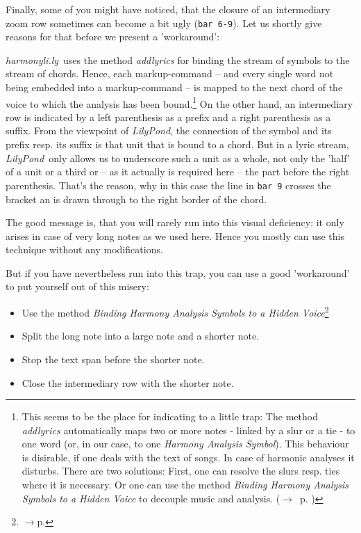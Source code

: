 \documentclass[
  DIV=calc,
  BCOR=5mm,
  12pt,
  headings=small,
  oneside,
  abstract=true,
  toc=bib,
  xcolor=dvipsnames,
  openany,
  english]{scrartcl}
\newcommand{\acc}[0]{\textit}
\newcommand{\ra}[0]{$\rightarrow$}
\newcommand{\hlyn}[0]{\textit{harmonyli.ly}}
\newcommand{\lily}[0]{\textit{LilyPond}}
\newcommand{\has}[1]{\textit{Harmony Analysis Symbol#1}}
\begin{document}
Finally, some of you might have noticed, that the closure of an intermediary
zoom row sometimes can become a bit ugly (\texttt{bar 6-9}). Let us shortly
give reasons for that before we present a 'workaround':

\hlyn\ uses the method \acc{addlyrics} for binding the stream of symbols to the
stream of chords. Hence, each markup-command -- and every single word not being
embedded into a markup-command -- is mapped to the next chord of the voice to
which the analysis has been bound.\footnote{This seems to be the place for
indicating to a little trap: The method \acc{addlyrics} automatically maps two
or more notes - linked by a slur or a tie - to one word (or, in our case, to one
\has{}). This behaviour is disirable, if one deals with the text of songs. In
case of harmonic analyses it disturbs. There are two solutions: First, one can
resolve the slurs resp. ties where it is necessary. Or one can use the method
\acc{Binding \has{s} to a Hidden Voice} to decouple music and analysis. (\ra \
p. \pageref{HiddenVoice})} On the other hand, an intermediary row is indicated
by a left parenthesis as a prefix and a right parenthesis as a suffix.
From the viewpoint of \lily, the connection of the symbol and its prefix resp.
its suffix is that unit that is bound to a chord. But in a lyric stream, \lily\
only allows us to underscore such a unit as a whole, not only the 'half' of a
unit or a third or -- as it actually is required here -- the part before the
right parenthesis. That's the reason, why in this case the line in \texttt{bar
9} crosses the bracket an is drawn through to the right border of the chord.

The good message is, that you will rarely run into this visual deficiency:
it only arises in case of very long notes as we used here. Hence you mostly can
use this technique without any modifications.

But if you have nevertheless run into this trap, you can use a good
'workaround' to put yourself out of this misery:

\begin{itemize}
  \item Use the method \acc{Binding \has{s} to a Hidden Voice}\footnote{\ra p.
  \pageref{HiddenVoice}}
  \item Split the long note into a large note and a shorter note.
  \item Stop the text span before the shorter note.
  \item Close the intermediary row with the shorter note.
\end{itemize}
\end{document}
